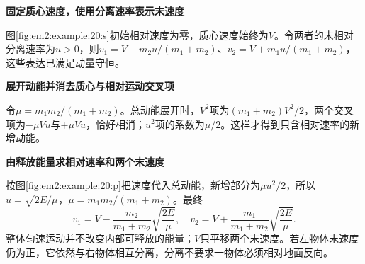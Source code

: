 \begin{solution}\textbf{固定质心速度，使用分离速率表示末速度}\par\nobreak
图\ref{fig:em2:example:20:s}初始相对速度为零，质心速度始终为$V$。令两者的末相对分离速率为$u>0$，则$v_1=V-m_2u/(m_1+m_2)$、$v_2=V+m_1u/(m_1+m_2)$，这些表达已满足动量守恒。



\par\medskip{}\noindent\textbf{展开动能并消去质心与相对运动交叉项}\par\nobreak
令$\mu=m_1m_2/(m_1+m_2)$。总动能展开时，$V^2$项为$(m_1+m_2)V^2/2$，两个交叉项为$-\mu Vu$与$+\mu Vu$，恰好相消；$u^2$项的系数为$\mu/2$。这样才得到只含相对速率的新增动能。



\par\medskip{}\noindent\textbf{由释放能量求相对速率和两个末速度}\par\nobreak
按图\ref{fig:em2:example:20:p}把速度代入总动能，新增部分为$\mu u^2/2$，所以$u=\sqrt{2E/\mu}$，$\mu=m_1m_2/(m_1+m_2)$。最终
\[\boxed{v_1=V-\frac{m_2}{m_1+m_2}\sqrt{\frac{2E}{\mu}},\quad v_2=V+\frac{m_1}{m_1+m_2}\sqrt{\frac{2E}{\mu}}}.\]
整体匀速运动并不改变内部可释放的能量；$V$只平移两个末速度。若左物体末速度仍为正，它依然与右物体相互分离，分离不要求一物体必须相对地面反向。\end{solution}
